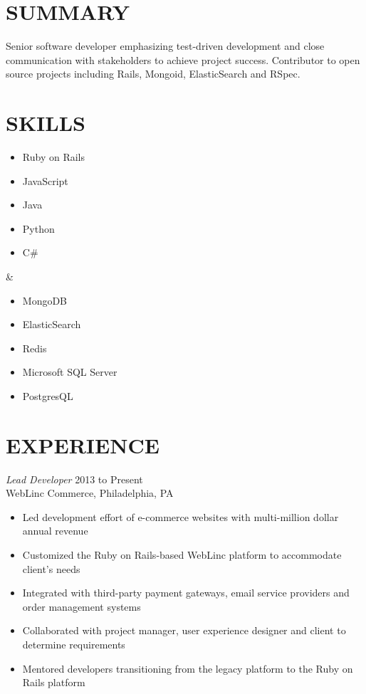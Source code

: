 \documentclass[line]{res}
\begin{document}
\newsectionwidth{0in}

\address{26 Park Ave., Apt E67, Chalfont, PA 18914}
\address{michaelcdalton@gmail.com / (267) 247-2541 / github.com/kcdragon}

\begin{resume}

\section{SUMMARY}
Senior software developer emphasizing test-driven development and close communication with stakeholders to achieve project success. Contributor to open source projects including Rails, Mongoid, ElasticSearch and RSpec.

\section{SKILLS}
\begin{ncolumn}{2}
\begin{itemize} \itemsep -2pt
\item Ruby on Rails
\item JavaScript
\item Java
\item Python
\item C\#
\end{itemize}
&
\begin{itemize} \itemsep -2pt
\item MongoDB
\item ElasticSearch
\item Redis
\item Microsoft SQL Server
\item PostgresQL
\end{itemize}
\end{ncolumn}

\section{EXPERIENCE}

{\sl Lead Developer} \hfill 2013 to Present \\
WebLinc Commerce, Philadelphia, PA
\begin{itemize} \itemsep -2pt
\item Led development effort of e-commerce websites with multi-million dollar annual revenue
\item Customized the Ruby on Rails-based WebLinc platform to accommodate client's needs
\item Integrated with third-party payment gateways, email service providers and order management systems
\item Collaborated with project manager, user experience designer and client to determine requirements
\item Mentored developers transitioning from the legacy platform to the Ruby on Rails platform
\end{itemize}


\end{resume}
\end{document}
